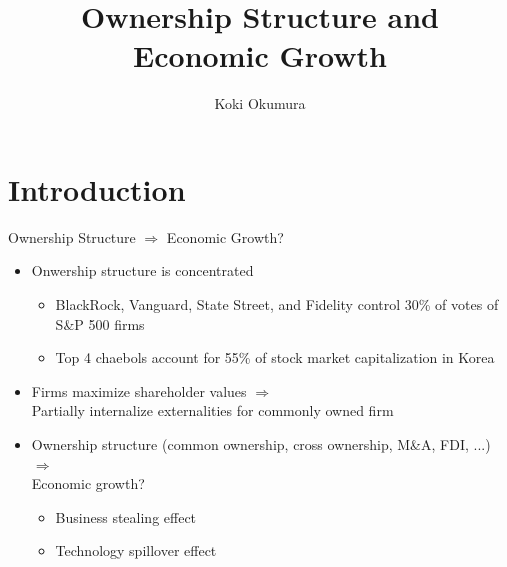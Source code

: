\documentclass[
  10pt,               %
  aspectratio=169,    %
  handout             %
]{beamer}
\title{Ownership Structure and Economic Growth}
\author{Koki Okumura}
\institute{UCLA}
\date{}
\theoremstyle{plain}
\begin{document}
\begin{frame}
  \titlepage
\end{frame}

\section{Introduction}

\begin{frame}{Ownership Structure $\Longrightarrow$ Economic Growth?}
  \label{intro} %
  \begin{itemize}
    \item Onwership structure is concentrated \hfill \hyperlink{share}{}
  \begin{itemize}
    \item BlackRock, Vanguard, State Street, and Fidelity control 30\% of votes
          of S\&P 500 firms
    \item Top 4 chaebols account for 55\% of stock market capitalization in Korea
  \end{itemize}
    \medskip{} \pause
    \item Firms maximize shareholder values $\Longrightarrow$ \\
          Partially internalize externalities for commonly owned firm
    \medskip{} \pause
    \item Ownership structure (common ownership, cross ownership, M\&A, FDI, ...) $\Longrightarrow$ \\
          Economic growth?
          \begin{itemize}
            \item Business stealing effect
            \item Technology spillover effect
          \end{itemize}
  \end{itemize}
\end{frame}
\end{document}
